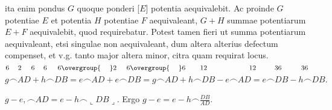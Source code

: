 ita enim pondus $G$ quoque ponderi\protect{}
[$E$]
potentia\protect{} aequivalebit.
Ac proinde  $G$ potentiae $E$ et potentia $H$ potentiae $F$ aequivaleant,  $G+H$ summae potentiarum $E+F$ aequivalebit, quod requirebatur. Potest tamen fieri ut summa potentiarum aequivaleant, etsi singulae non aequivaleant, dum altera alterius defectum compenset, et v.g. tanto major
altera minor, citra quam requirat locus.%
\pend
\vspace{1.5em}
\pend
\vspace{0.5em}
\pstart
\noindent
\footnotesize
$\displaystyle 6 \hspace{4,5mm} 2 \hspace{5,0mm} 6 \hspace{4,5mm} 6 \hspace{5,5mm} 6 \overgroup{\phantom{aic}} 2 \hspace{5,1mm} 6 \overgroup{\phantom{aic}} 6 \hspace{7,5mm} 12 \hspace{21,5mm} 12 \hspace{9,5mm} 36 \hspace{10,0mm} 36$
\newline%
$\displaystyle g\smallfrown AD + h \smallfrown DB = e \smallfrown AD + e \smallfrown DB = g \smallfrown AD + h \smallfrown DB - e \smallfrown AD = e \smallfrown DB - h \smallfrown DB.$
\newline%
\noindent%
\rule[0mm]{0mm}{5mm}%
$\displaystyle g - e , \smallfrown AD = e - h \smallfrown \llcorner DB \lrcorner .$
\quad Ergo $\displaystyle g - e = e - h \smallfrown \frac{DB}{AD}.$
